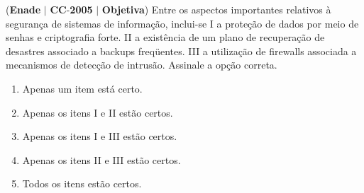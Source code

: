 \documentclass{exam}
\begin{document}
\begin{questions}
\question (\textbf{Enade} $|$ \textbf{CC}-\textbf{2005} $|$ \textbf{Objetiva})
Entre os aspectos importantes relativos à segurança de sistemas
de informação, inclui-se
I a proteção de dados por meio de senhas e criptografia forte.
II a existência de um plano de recuperação de desastres
associado a backups freqüentes.
III a utilização de firewalls associada a mecanismos de
detecção de intrusão.
Assinale a opção correta.
	\begin{enumerate}[label=\alph*)]
		\item  Apenas um item está certo.
		\item  Apenas os itens I e II estão certos.
		\item  Apenas os itens I e III estão certos.
		\item  Apenas os itens II e III estão certos.
		\item  Todos os itens estão certos.
	\end{enumerate}


\end{questions}
\end{document}
